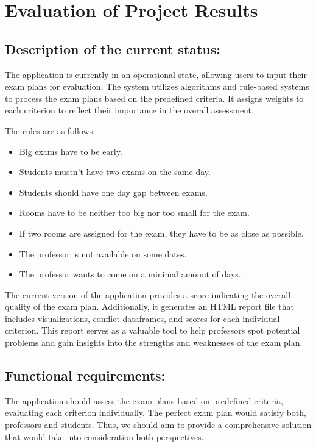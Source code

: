 \section{Evaluation of Project Results}
\subsection{Description of the current status:}

The application is currently in an operational state, allowing users to input their exam plans for evaluation. The system utilizes algorithms and rule-based systems to process the exam plans based on the predefined criteria. It assigns weights to each criterion to reflect their importance in the overall assessment.


\vspace{\baselineskip}


The rules are as follows:

\begin{itemize}
\item Big exams have to be early.
\item Students mustn't have two exams on the same day.
\item Students should have one day gap between exams.
\item Rooms have to be neither too big nor too small for the exam.
\item If two rooms are assigned for the exam, they have to be as close as possible.
\item The professor is not available on some dates.
\item The professor wants to come on a minimal amount of days.
\end{itemize}

The current version of the application provides a score indicating the overall quality of the exam plan. Additionally, it generates an HTML report file that includes visualizations, conflict dataframes, and scores for each individual criterion. This report serves as a valuable tool to help professors spot potential problems and gain insights into the strengths and weaknesses of the exam plan.

\subsection{Functional requirements:}


The application should assess the exam plans based on predefined criteria, evaluating each criterion individually. The perfect exam plan would satisfy both, professors and students. Thus, we should aim to provide a comprehensive solution that would take into consideration both perspectives.

